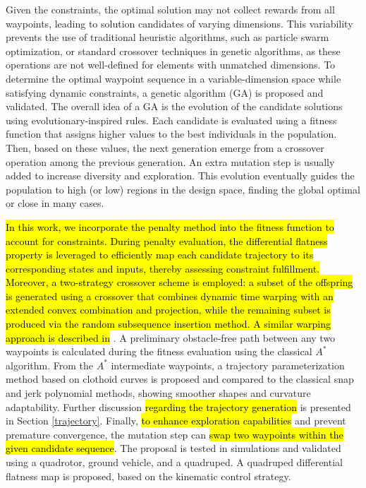 Given the constraints, the optimal solution may not collect rewards from all waypoints, leading to solution candidates of varying dimensions. This variability prevents the use of traditional heuristic algorithms, such as particle swarm optimization, or standard crossover techniques in genetic algorithms, as these operations are not well-defined for elements with unmatched dimensions. To determine the optimal waypoint sequence in a variable-dimension space while satisfying dynamic constraints, a genetic algorithm (GA) is proposed and validated. The overall idea of a GA is the evolution of the candidate solutions using evolutionary-inspired rules. Each candidate is evaluated using a fitness function that assigns higher values to the best individuals in the population. Then, based on these values, the next generation emerge from a crossover operation among the previous generation. An extra mutation step is usually added to increase diversity and exploration. This evolution eventually guides the population to high (or low) regions in the design space, finding the global optimal or close in many cases.


\hl{In this work, we incorporate the penalty method into the fitness function to account for constraints. During penalty evaluation, the differential flatness property is leveraged to efficiently map each candidate trajectory to its corresponding states and inputs, thereby assessing constraint fulfillment. Moreover, a two-strategy crossover scheme is employed: a subset of the offspring is generated using a crossover that combines dynamic time warping with an extended convex combination and projection, while the remaining subset is produced via the random subsequence insertion method. A similar warping approach is described in} \cite{ha2021variable}. A preliminary obstacle-free path between any two waypoints is calculated during the fitness evaluation using the classical $A^*$ algorithm. From the $A^*$ intermediate waypoints, a trajectory parameterization method based on clothoid curves is proposed and compared to the classical snap and jerk polynomial methods, showing smoother shapes and curvature adaptability. Further discussion \hl{regarding the trajectory generation} is presented in Section \ref{trajectory}. Finally, \hl{to enhance exploration capabilities} and prevent premature convergence, the mutation step can \hl{swap two waypoints within the given candidate sequence}. The proposal is tested in simulations and validated using a quadrotor, ground vehicle, and a quadruped. A quadruped differential flatness map is proposed, based on the kinematic control strategy.